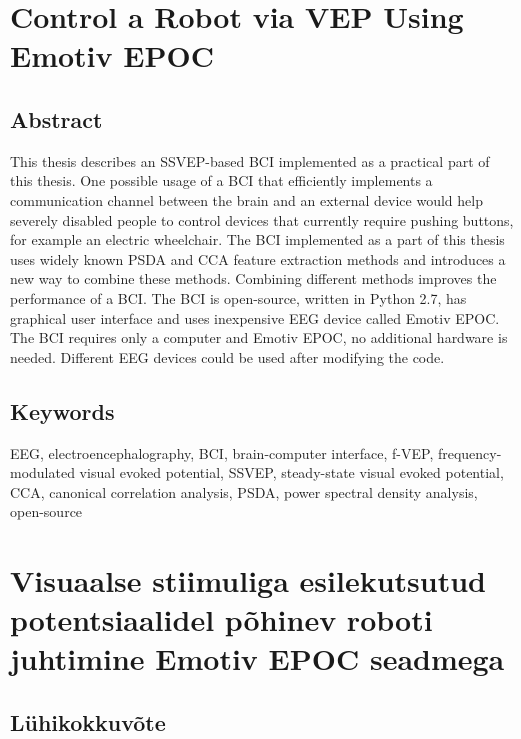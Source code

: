 \chapter*{Control a Robot via VEP Using Emotiv EPOC}

\section*{Abstract}

\normalsize
This thesis describes an \acrshort{SSVEP}-based \acrshort{BCI} implemented as a practical part of this thesis. One possible usage of a \acrshort{BCI} that efficiently implements a communication channel between the brain and an external device would help severely disabled people to control devices that currently require pushing buttons, for example an electric wheelchair. The \acrshort{BCI} implemented as a part of this thesis uses widely known \acrshort{PSDA} and \acrshort{CCA} feature extraction methods and introduces a new way to combine these methods. Combining different methods improves the performance of a \acrshort{BCI}. The \acrshort{BCI} is open-source, written in Python 2.7, has graphical user interface and uses inexpensive \acrshort{EEG} device called Emotiv EPOC. The \acrshort{BCI} requires only a computer and Emotiv EPOC, no additional hardware is needed. Different \acrshort{EEG} devices could be used after modifying the code. 

\section*{Keywords}

\acrshort{EEG}, electroencephalography, \acrshort{BCI}, brain-computer interface, f-VEP, frequency-modulated visual evoked potential, \acrshort{SSVEP}, steady-state visual evoked potential, \acrshort{CCA}, canonical correlation analysis, \acrshort{PSDA}, power spectral density analysis, open-source
\chapter*{Visuaalse stiimuliga esilekutsutud potentsiaalidel põhinev roboti juhtimine Emotiv EPOC seadmega}

\section*{Lühikokkuvõte}

